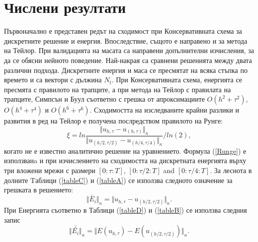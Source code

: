 \documentclass{article}
\newcommand{\rf}[1]{(\ref{#1})}
\begin{document}
\section{Числени резултати}

Първоначално е представен редът на сходимост при Консервативната схема за дискретните решение и енергия. Впоследствие, същото е направено и за метода на Тейлор. При валидацията на масата са направени допълнителни изчисления, за да се обясни нейното поведение. Най-накрая са сравнени решенията между двата различни подхода. Дискретните енергия и маса се пресмятат на всяка стъпка по времето и са вектори с дължина $N_t$. При Консервативната схема, енергията се пресмята с правилото на трапците, а при метода на Тейлор с правилата на трапците, Симпсън и Буул съответно с грешка от апроксимациите $O(h^{2} + \tau^2 )$, $O(h^{4} + \tau^4 )$ и $O(h^{6} + \tau^6 )$. Сходимостта на изследваните крайни разлики и развития в ред на Тейлор е получена послредством правилото на Рунге:
\begin{equation}\label{Runge}
\xi = ln  \frac{\Vert u_{h,\tau} - u_{(h,\tau)} \Vert_\kappa } {\Vert  u_{(h/2,\tau/2)} - u_{(h/4,\tau/4)} \Vert_\kappa  } / ln(2),
\end{equation}
когато не е известно аналитично решение на уравнението. Формула \rf{Runge} е използванa и при изчислението на сходимостта на дискретната енергията върху три вложени мрежи с размери $[0:\tau:T]$, $[0:\tau/2:T]$ and $[0:\tau/4:T]$. За леснота в долните Tаблици \rf{tableC} и \rf{tableA} се използва следното означение за грешката в решението:
$$\Vert \bar E_i \Vert_\kappa =  \Vert u_{h,\tau} - u_{(h/2,\tau/2)} \Vert_\kappa.$$ 
При Енергията съответно в Таблици \rf{tableD} и \rf{tableB} се използва следния запис
$$\Vert \bar{\bar{ E_i}} \Vert_\kappa=  \Vert E(u_{h,\tau}) - E(u_{(h/2,\tau/2)}) \Vert_\kappa.$$ 
\end{document}

